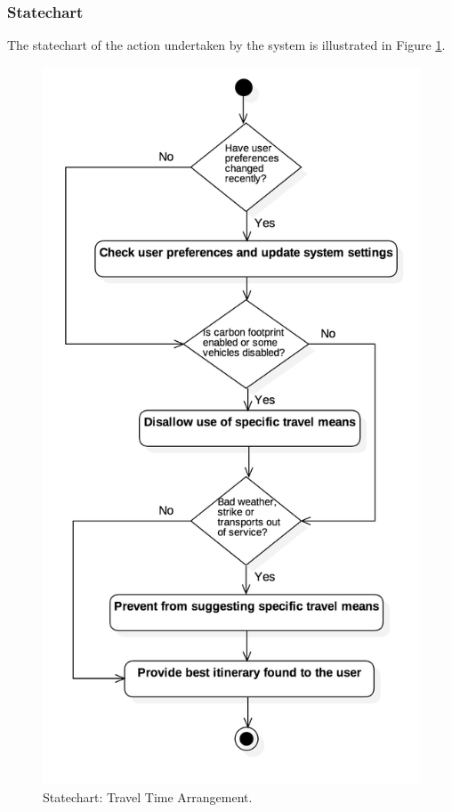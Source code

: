 \subsubsection{Statechart}
The statechart of the action undertaken by the system is illustrated in Figure \ref{fig:StateChecks}.
\begin{figure}
	\centering
	\includegraphics[width=5in]{./diagrams/StatechartChecks.png}
	\caption{Statechart: Travel Time Arrangement.}
	\label{fig:StateChecks}
\end{figure}

